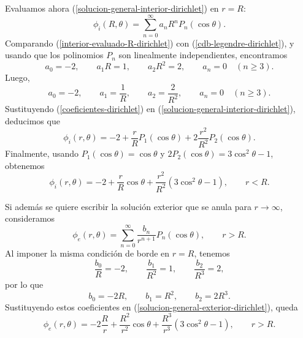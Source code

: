 \documentclass[11pt]{article}
\begin{document}
Evaluamos ahora (\ref{solucion-general-interior-dirichlet}) en $r=R$:
\begin{equation}
\label{interior-evaluado-R-dirichlet}
\phi_i(R,\theta)=\sum_{n=0}^{\infty}a_nR^nP_n(\cos\theta).
\end{equation}
Comparando (\ref{interior-evaluado-R-dirichlet}) con (\ref{cdb-legendre-dirichlet}), y usando que los polinomios $P_n$ son linealmente independientes, encontramos
\begin{equation*}
a_0=-2,
\qquad
 a_1R=1,
\qquad
 a_2R^2=2,
\qquad
 a_n=0 \quad (n\geq 3).
\end{equation*}
Luego,
\begin{equation}
\label{coeficientes-dirichlet}
a_0=-2,
\qquad
 a_1=\frac{1}{R},
\qquad
 a_2=\frac{2}{R^2},
\qquad
 a_n=0 \quad (n\geq 3).
\end{equation}
Sustituyendo (\ref{coeficientes-dirichlet}) en (\ref{solucion-general-interior-dirichlet}), deducimos que
\begin{equation*}
\phi_i(r,\theta)=-2+\frac{r}{R}P_1(\cos\theta)+2\frac{r^2}{R^2}P_2(\cos\theta).
\end{equation*}
Finalmente, usando $P_1(\cos\theta)=\cos\theta$ y $2P_2(\cos\theta)=3\cos^2\theta-1$, obtenemos
\begin{equation*}
\boxed{
\phi_i(r,\theta)=-2+\frac{r}{R}\cos\theta+\frac{r^2}{R^2}\left(3\cos^2\theta-1\right)},
\qquad r<R.
\end{equation*}

Si además se quiere escribir la solución exterior que se anula para $r\to\infty$, consideramos
\begin{equation}
\label{solucion-general-exterior-dirichlet}
\phi_e(r,\theta)=\sum_{n=0}^{\infty}\frac{b_n}{r^{n+1}}P_n(\cos\theta),
\qquad r>R.
\end{equation}
Al imponer la misma condición de borde en $r=R$, tenemos
\begin{equation*}
\frac{b_0}{R}=-2,
\qquad
\frac{b_1}{R^2}=1,
\qquad
\frac{b_2}{R^3}=2,
\end{equation*}
por lo que
\begin{equation*}
b_0=-2R,
\qquad
b_1=R^2,
\qquad
b_2=2R^3.
\end{equation*}
Sustituyendo estos coeficientes en (\ref{solucion-general-exterior-dirichlet}), queda
\begin{equation*}
\boxed{
\phi_e(r,\theta)=-2\frac{R}{r}+\frac{R^2}{r^2}\cos\theta+\frac{R^3}{r^3}\left(3\cos^2\theta-1\right)},
\qquad r>R.
\end{equation*}
\end{document}
